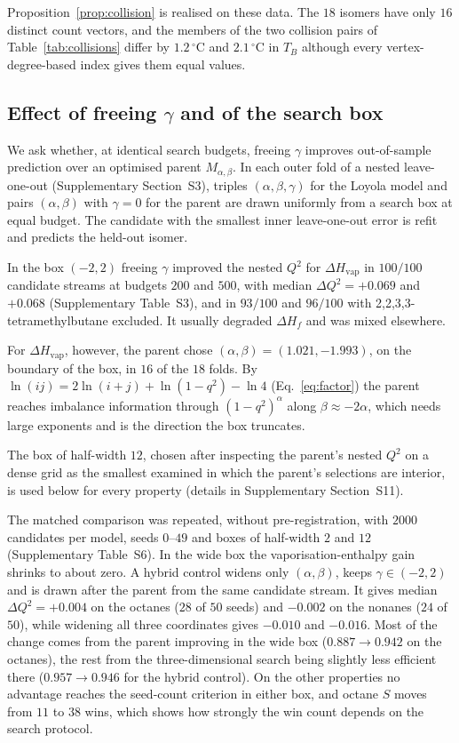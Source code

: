 \documentclass[a5paper, 10pt]{article}
\theoremstyle{plain}
\theoremstyle{remark}
\theoremstyle{definition}
\begin{document}
Proposition~\ref{prop:collision} is realised on these data. The $18$
isomers have only $16$ distinct count vectors, and the members of the
two collision pairs of Table~\ref{tab:collisions} differ by $1.2\,^{\circ}$C and $2.1\,^{\circ}$C in $T_B$ although every
vertex-degree-based index gives them equal values.

\subsection{Effect of freeing $\gamma$ and of the search
box}\label{sec:ablation}

We ask whether, at identical search budgets, freeing $\gamma$ improves
out-of-sample prediction over an optimised parent $M_{\alpha,\beta}$.
In each outer fold of a nested leave-one-out (Supplementary Section~S3),
triples $(\alpha,\beta,\gamma)$ for the Loyola model and pairs
$(\alpha,\beta)$ with $\gamma = 0$ for the parent are drawn uniformly
from a search box at equal budget. The candidate with the smallest
inner leave-one-out error is refit and predicts the held-out isomer.

In the box $(-2,2)$ freeing $\gamma$ improved the nested $Q^2$ for
$\Delta H_{\mathrm{vap}}$ in $100/100$ candidate streams at budgets
$200$ and $500$, with median $\Delta Q^2 = +0.069$ and $+0.068$
(Supplementary Table~S3), and in $93/100$ and $96/100$ with
2,2,3,3-tetramethylbutane excluded. It usually degraded $\Delta H_f$ and
was mixed elsewhere.

For $\Delta H_{\mathrm{vap}}$, however, the parent
chose $(\alpha,\beta) = (1.021, -1.993)$, on the boundary of the box, in
$16$ of the $18$ folds. By $\ln(ij) = 2\ln(i+j) + \ln(1-q^2) - \ln 4$
(Eq.~\eqref{eq:factor}) the parent reaches imbalance information through
$(1-q^2)^{\alpha}$ along $\beta \approx -2\alpha$, which needs large
exponents and is the direction the box truncates.

The box of half-width $12$, chosen after inspecting the parent's nested $Q^2$ on a dense grid as the smallest examined in which the parent's selections are interior, is used below for every property (details in Supplementary Section~S11).

The matched comparison was repeated, without pre-registration, with
$2000$ candidates per model, seeds $0$--$49$ and boxes of half-width $2$
and $12$ (Supplementary Table~S6). In the wide box the
vaporisation-enthalpy gain shrinks to about zero. A hybrid control
widens only $(\alpha,\beta)$, keeps $\gamma \in (-2,2)$ and is drawn
after the parent from the same candidate stream. It gives median
$\Delta Q^2 = +0.004$ on the octanes ($28$ of $50$ seeds) and $-0.002$
on the nonanes ($24$ of $50$), while widening all three coordinates
gives $-0.010$ and $-0.016$. Most of the change comes from the parent
improving in the wide box ($0.887 \to 0.942$ on the octanes), the rest
from the three-dimensional search being slightly less efficient there
($0.957 \to 0.946$ for the hybrid control). On the other properties no
advantage reaches the seed-count criterion in either box, and octane $S$ moves from $11$ to $38$ wins, which shows how strongly the win count depends on the search protocol.
\end{document}

